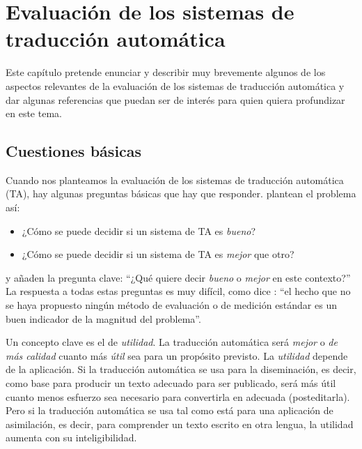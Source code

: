 \chapter[Evaluación de los sistemas de TA]{Evaluación de los sistemas de traducción automática} \label{se:ASTA} 

Este capítulo pretende enunciar y describir muy brevemente algunos de los aspectos relevantes de la evaluación de los sistemas de traducción automática y dar algunas referencias que puedan ser de interés para quien quiera profundizar en este tema. 

\section{Cuestiones básicas} Cuando nos planteamos la evaluación de los sistemas de traducción automática (TA), hay algunas preguntas básicas que hay que responder. \citet{arnold94b} plantean el problema así: \begin{itemize} \item¿Cómo se puede decidir si un sistema de TA es \emph{bueno}? \item¿Cómo se puede decidir si un sistema de TA es \emph{mejor} que otro? \end{itemize} y añaden la pregunta clave: ``¿Qué quiere decir \emph{bueno} o \emph{mejor} en este contexto?'' La respuesta a todas estas preguntas es muy difícil, como dice \citet{minnis94j}: ``el hecho que no se haya propuesto ningún método de evaluación o de medición estándar es un buen indicador de la magnitud del problema''. 

Un concepto clave es el de \emph{utilidad}. La traducción automática será \emph{mejor} o \emph{de más calidad} cuanto más \emph{útil} sea para un propósito previsto. La \emph{utilidad} depende de la aplicación. Si la traducción automática se usa para la diseminación, es decir, como base para producir un texto adecuado para ser publicado, será más útil cuanto menos esfuerzo sea necesario para convertirla en adecuada (posteditarla). Pero si la traducción automática se usa tal como está para una aplicación de asimilación, es decir, para comprender un texto escrito en otra lengua, la utilidad aumenta con su inteligibilidad. 

